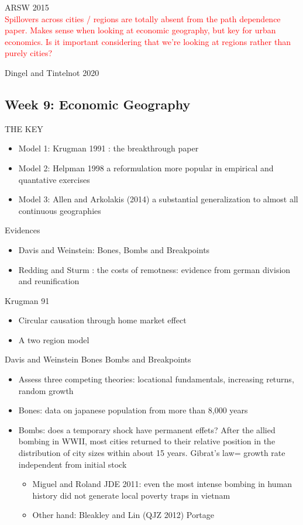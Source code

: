 \documentclass[12pt, final]{article}
\begin{document}
ARSW 2015
\\
\textcolor{red}{Spillovers across cities / regions are totally absent from the path dependence paper. Makes sense when looking at economic geography, but key for urban economics. Is it important considering that we're looking at regions rather than purely cities?}

Dingel and Tintelnot 2020



\subsection{Week 9: Economic Geography} %
\label{sub:week_9_economic_geography}
THE KEY

\begin{itemize}
    \item Model 1: Krugman 1991 : the breakthrough paper
    \item Model 2: Helpman 1998 a reformulation more popular in empirical and quantative exercises
    \item Model 3: Allen and Arkolakis (2014) a substantial generalization to almost all continuous geographies
\end{itemize}
Evidences
\begin{itemize}
    \item Davis and Weinstein: Bones, Bombs and Breakpoints
    \item Redding and Sturm : the costs of remotness: evidence from german division and reunification
\end{itemize}


Krugman 91
\begin{itemize}
    \item Circular causation through home market effect
    \item A two region model
\end{itemize}

Davis and Weinstein Bones Bombs and Breakpoints
\begin{itemize}
    \item Assess three competing theories: locational fundamentals, increasing returns, random growth
    \item Bones: data on japanese population from more than 8,000 years
    \item Bombs: does a temporary shock have permanent effets? After the allied bombing in WWII, most cities returned to their relative position in the distribution of city sizes within about 15 years. Gibrat's law= growth rate independent from initial stock
    \begin{itemize}
        \item Miguel and Roland JDE 2011: even the most intense bombing in human history did not generate local poverty traps in vietnam
        \item Other hand: Bleakley and Lin (QJZ 2012) Portage
    \end{itemize}
\end{itemize}
\end{document}
